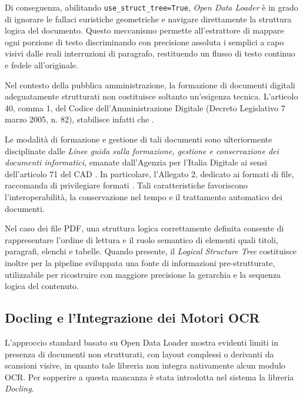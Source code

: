 Di conseguenza, abilitando \texttt{use\_struct\_tree=True}, \textit{Open Data Loader} è in grado di ignorare le fallaci euristiche geometriche e navigare direttamente la struttura logica del documento. Questo meccanismo permette all'estrattore di mappare ogni porzione di testo discriminando con precisione assoluta i semplici a capo visivi dalle reali interruzioni di paragrafo, restituendo un flusso di testo continuo e fedele all'originale.

Nel contesto della pubblica amministrazione, la formazione di documenti digitali adeguatamente strutturati non costituisce soltanto un'esigenza tecnica. L’articolo 40, comma 1, del Codice dell’Amministrazione Digitale (Decreto Legislativo 7 marzo 2005, n. 82), stabilisce infatti che  \cite{cad_art40}.

Le modalità di formazione e gestione di tali documenti sono ulteriormente disciplinate dalle \textit{Linee guida sulla formazione, gestione e conservazione dei documenti informatici}, emanate dall'Agenzia per l'Italia Digitale ai sensi dell'articolo 71 del CAD \cite{agid_documenti_informatici}. In particolare, l'Allegato 2, dedicato ai formati di file, raccomanda di privilegiare formati  \cite{agid_formati_file}. Tali caratteristiche favoriscono l'interoperabilità, la conservazione nel tempo e il trattamento automatico dei documenti.

Nel caso dei file PDF, una struttura logica correttamente definita consente di rappresentare l'ordine di lettura e il ruolo semantico di elementi quali titoli, paragrafi, elenchi e tabelle. Quando presente, il \textit{Logical Structure Tree} costituisce inoltre per la pipeline sviluppata una fonte di informazioni pre-strutturate, utilizzabile per ricostruire con maggiore precisione la gerarchia e la sequenza logica del contenuto.


\subsection{Docling e l'Integrazione dei Motori OCR}

L'approccio standard basato su Open Data Loader mostra evidenti limiti in presenza di documenti non strutturati, con layout complessi o derivanti da scansioni visive, in quanto tale libreria non integra nativamente alcun modulo OCR. Per sopperire a questa mancanza è stata introdotta nel sistema la libreria \textit{Docling}. 

